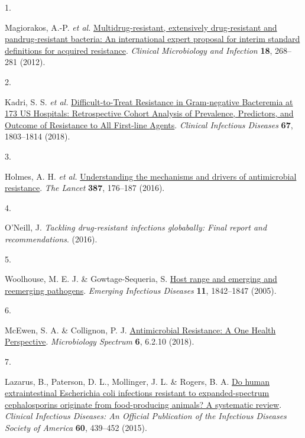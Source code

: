 \documentclass[
]{book}
\newlength{\cslhangindent}
\newlength{\csllabelwidth}
\newlength{\cslentryspacingunit} %
\newenvironment{CSLReferences}[2] %
 {%
  \setlength{\parindent}{0pt}
  \ifodd #1
  \let\oldpar\par
  \def\par{\hangindent=\cslhangindent\oldpar}
  \fi
  \setlength{\parskip}{#2\cslentryspacingunit}
 }%
 {}
\newcommand{\CSLLeftMargin}[1]{\parbox[t]{\csllabelwidth}{#1}}
\newcommand{\CSLRightInline}[1]{\parbox[t]{\linewidth - \csllabelwidth}{#1}\break}
\begin{document}
\hypertarget{refs}{}
\begin{CSLReferences}{0}{0}
\leavevmode{}%
\CSLLeftMargin{1. }
\CSLRightInline{Magiorakos, A.-P. \emph{et al.} \href{https://doi.org/10.1111/j.1469-0691.2011.03570.x}{Multidrug-resistant, extensively drug-resistant and pandrug-resistant bacteria: An international expert proposal for interim standard definitions for acquired resistance}. \emph{Clinical Microbiology and Infection} \textbf{18}, 268--281 (2012).}

\leavevmode{}%
\CSLLeftMargin{2. }
\CSLRightInline{Kadri, S. S. \emph{et al.} \href{https://doi.org/10.1093/cid/ciy378}{Difficult-to-{Treat Resistance} in {Gram}-negative {Bacteremia} at 173 {US Hospitals}: Retrospective {Cohort Analysis} of {Prevalence}, {Predictors}, and {Outcome} of {Resistance} to {All First}-line {Agents}}. \emph{Clinical Infectious Diseases} \textbf{67}, 1803--1814 (2018).}

\leavevmode{}%
\CSLLeftMargin{3. }
\CSLRightInline{Holmes, A. H. \emph{et al.} \href{https://doi.org/10.1016/S0140-6736(15)00473-0}{Understanding the mechanisms and drivers of antimicrobial resistance}. \emph{The Lancet} \textbf{387}, 176--187 (2016).}

\leavevmode{}%
\CSLLeftMargin{4. }
\CSLRightInline{O'Neill, J. \emph{Tackling drug-resistant infections globabally: Final report and recommendations}. (2016).}

\leavevmode{}%
\CSLLeftMargin{5. }
\CSLRightInline{Woolhouse, M. E. J. \& Gowtage-Sequeria, S. \href{https://doi.org/10.3201/eid1112.050997}{Host range and emerging and reemerging pathogens}. \emph{Emerging Infectious Diseases} \textbf{11}, 1842--1847 (2005).}

\leavevmode{}%
\CSLLeftMargin{6. }
\CSLRightInline{McEwen, S. A. \& Collignon, P. J. \href{https://doi.org/10.1128/microbiolspec.ARBA-0009-2017}{Antimicrobial {Resistance}: A {One Health Perspective}}. \emph{Microbiology Spectrum} \textbf{6}, 6.2.10 (2018).}

\leavevmode{}%
\CSLLeftMargin{7. }
\CSLRightInline{Lazarus, B., Paterson, D. L., Mollinger, J. L. \& Rogers, B. A. \href{https://doi.org/10.1093/cid/ciu785}{Do human extraintestinal {Escherichia} coli infections resistant to expanded-spectrum cephalosporins originate from food-producing animals? A systematic review}. \emph{Clinical Infectious Diseases: An Official Publication of the Infectious Diseases Society of America} \textbf{60}, 439--452 (2015).}


\end{CSLReferences}
\end{document}
